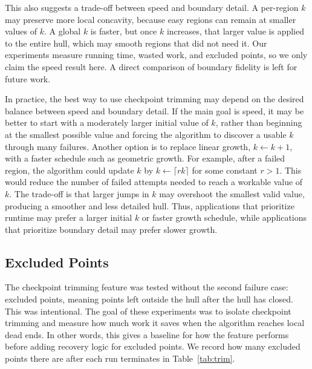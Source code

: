 \documentclass[a4paper,twoside]{article}
\begin{document}
This also suggests a trade-off between speed and boundary detail. A per-region \(k\) may preserve more local concavity, because easy regions can remain at smaller values of \(k\). A global \(k\) is faster, but once \(k\) increases, that larger value is applied to the entire hull, which may smooth regions that did not need it. Our experiments measure running time, wasted work, and excluded points, so we only claim the speed result here. A direct comparison of boundary fidelity is left for future work.

In practice, the best way to use checkpoint trimming may depend on the desired balance between speed and boundary detail. If the main goal is speed, it may be better to start with a moderately larger initial value of \(k\), rather than beginning at the smallest possible value and forcing the algorithm to discover a usable \(k\) through many failures. Another option is to replace linear growth, \(k \leftarrow k+1\), with a faster schedule such as geometric growth. For example, after a failed region, the algorithm could update \(k\) by \(k \leftarrow \lceil rk\rceil\) for some constant \(r>1\). This would reduce the number of failed attempts needed to reach a workable value of \(k\). The trade-off is that larger jumps in \(k\) may overshoot the smallest valid value, producing a smoother and less detailed hull. Thus, applications that prioritize runtime may prefer a larger initial \(k\) or faster growth schedule, while applications that prioritize boundary detail may prefer slower growth.

\subsection{Excluded Points}
The checkpoint trimming feature was tested without the second failure case: excluded points, meaning points left outside the hull after the hull has closed. This was intentional. The goal of these experiments was to isolate checkpoint trimming and measure how much work it saves when the algorithm reaches local dead ends. In other words, this gives a baseline for how the feature performs before adding recovery logic for excluded points. We record how many excluded points there are after each run terminates in Table~\ref{tab:trim}.
\end{document}
